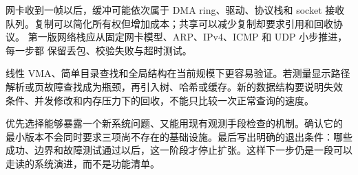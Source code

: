 网卡收到一帧以后，缓冲可能依次属于 DMA ring、驱动、协议栈和 socket 接收
队列。复制可以简化所有权但增加成本；共享可以减少复制却要求引用和回收协议。
第一版网络栈应从固定网卡模型、ARP、IPv4、ICMP 和 UDP 小步推进，每一步都
保留丢包、校验失败与超时测试。

线性 VMA、简单目录查找和全局结构在当前规模下更容易验证。若测量显示路径
解析或页故障查找成为瓶颈，再引入树、哈希或缓存。新的数据结构要说明失效
条件、并发修改和内存压力下的回收，不能只比较一次正常查询的速度。

优先选择能够暴露一个新系统问题、又能用现有观测手段检查的机制。确认它的
最小版本不会同时要求三项尚不存在的基础设施。最后写出明确的退出条件：哪些
成功、边界和故障测试通过以后，这一阶段才停止扩张。这样下一步仍是一段可以
走读的系统演进，而不是功能清单。
